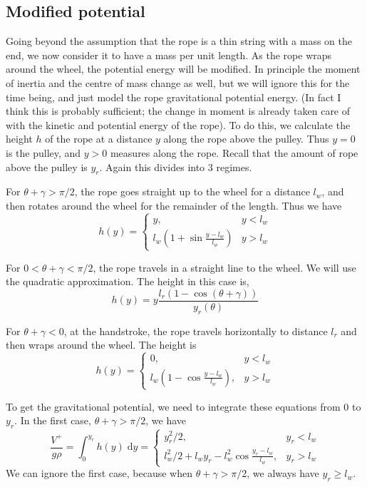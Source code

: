 \documentclass{article}
\begin{document}
\subsection{Modified potential}

Going beyond the assumption that the rope is a thin string with a mass on
the end, we now consider it to have a mass per unit length.
As the rope wraps around the wheel, the potential energy will be modified.
In principle the  moment of inertia and the centre of mass change as well,
but we will ignore this for the time being, and just  model the
rope gravitational potential energy. (In fact I think this is probably sufficient;
the change in moment is already taken care of with the kinetic and potential energy
of the rope). To do this, we calculate the
height $h$ of the rope at a distance $y$ along the rope above the pulley. 
Thus $y=0$ is the pulley, and $y > 0$ measures along the rope. Recall that the
amount of rope above the pulley is $y_r$.
Again this divides
into 3 regimes.

For $\theta + \gamma > \pi/2$, the rope goes straight up to the
wheel for a distance $l_w$, and then rotates around the wheel for
the remainder of the length.  Thus we have
\begin{equation}
h(y) = \left\{ \begin{array}{cl} y, & y < l_w \\
                                 l_w\left(1+\sin \frac{y-l_w}{l_w}\right) & y > l_w
\end{array} \right.
\end{equation}

For $0 < \theta+\gamma < \pi/2$, the rope travels in a straight line to
the wheel.  We will use the quadratic approximation. The height in this case
is,
\begin{equation}
h(y) = y \frac{l_r \left(1-\cos(\theta+\gamma)\right)}{y_r(\theta)}
\end{equation}

For $\theta+\gamma < 0$, at the handstroke, the rope travels horizontally
to distance $l_r$ and then wraps around the wheel.  The height is
\begin{equation}
h(y) = \left\{ \begin{array}{cl} 0, & y < l_w \\
    l_w \left(1-\cos\frac{y-l_w}{l_w}\right), & y > l_w
\end{array} \right.
\end{equation}

To get the gravitational potential, we need to integrate these equations
from $0$ to $y_r$. In the first case,  $\theta + \gamma > \pi/2$, we have
\begin{equation}
\frac{V^+}{g\rho} = \int_0^{y_r} h(y) \; \mathrm{d}y =  \left\{ \begin{array}{cl} y_r^2/2, & y_r < l_w \\
l_w^2/2 + l_w y_r - l_w^2 \cos \frac{y_r - l_w}{l_w}, & y_r > l_w
\end{array} \right.
\end{equation}
We can ignore the first case, because when $\theta + \gamma > \pi/2$, we always have $y_r \geq l_w$.
\end{document}
